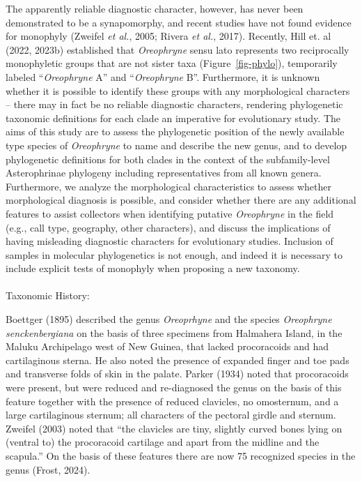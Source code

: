 \documentclass[
  letterpaper,
  DIV=11,
  numbers=noendperiod]{scrartcl}
\makeatletter
\let\oldparagraph\paragraph
\renewcommand{\paragraph}{
    \@ifstar
      \xxxParagraphStar
      \xxxParagraphNoStar
  }
\newcommand{\xxxParagraphStar}[1]{\oldparagraph*{#1}\mbox{}}
\newcommand{\xxxParagraphNoStar}[1]{\oldparagraph{#1}\mbox{}}
\makeatother
\begin{document}
The apparently reliable diagnostic character, however, has never been
demonstrated to be a synapomorphy, and recent studies have not found
evidence for monophyly (Zweifel \emph{et al.}, 2005; Rivera \emph{et
al.}, 2017). Recently, Hill et. al (2022, 2023b) established that
\emph{Oreophryne} sensu lato represents two reciprocally monophyletic
groups that are not sister taxa (Figure~\ref{fig-phylo}), temporarily
labeled ``\emph{Oreophryne} A'' and ``\emph{Oreophryne} B''.
Furthermore, it is unknown whether it is possible to identify these
groups with any morphological characters -- there may in fact be no
reliable diagnostic characters, rendering phylogenetic taxonomic
definitions for each clade an imperative for evolutionary study. The
aims of this study are to assess the phylogenetic position of the newly
available type species of \emph{Oreophryne} to name and describe the new
genus, and to develop phylogenetic definitions for both clades in the
context of the subfamily-level Asterophrinae phylogeny including
representatives from all known genera. Furthermore, we analyze the
morphological characteristics to assess whether morphological diagnosis
is possible, and consider whether there are any additional features to
assist collectors when identifying putative \emph{Oreophryne} in the
field (e.g., call type, geography, other characters), and discuss the
implications of having misleading diagnostic characters for evolutionary
studies. Inclusion of samples in molecular phylogenetics is not enough,
and indeed it is necessary to include explicit tests of monophyly when
proposing a new taxonomy.

\paragraph{Taxonomic History:}\label{taxonomic-history}

Boettger (1895) described the genus \emph{Oreoprhyne} and the species
\emph{Oreophryne senckenbergiana} on the basis of three specimens from
Halmahera Island, in the Maluku Archipelago west of New Guinea, that
lacked procoracoids and had cartilaginous sterna. He also noted the
presence of expanded finger and toe pads and transverse folds of skin in
the palate. Parker (1934) noted that procoracoids were present, but were
reduced and re-diagnosed the genus on the basis of this feature together
with the presence of reduced clavicles, no omosternum, and a large
cartilaginous sternum; all characters of the pectoral girdle and
sternum. Zweifel (2003) noted that ``the clavicles are tiny, slightly
curved bones lying on (ventral to) the procoracoid cartilage and apart
from the midline and the scapula.'' On the basis of these features there
are now 75 recognized species in the genus (Frost, 2024).
\end{document}
